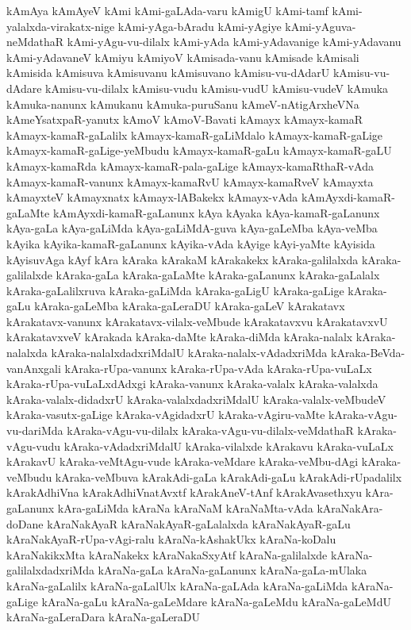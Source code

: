 {kAmAya
kAmAyeV
kAmi
kAmi-gaLAda-varu
kAmigU
kAmi-tamf
kAmi-yalalxda-virakatx-nige
kAmi-yAga-bAradu
kAmi-yAgiye
kAmi-yAguva-neMdathaR
kAmi-yAgu-vu-dilalx
kAmi-yAda
kAmi-yAdavanige
kAmi-yAdavanu
kAmi-yAdavaneV
kAmiyu
kAmiyoV
kAmisada-vanu
kAmisade
kAmisali
kAmisida
kAmisuva
kAmisuvanu
kAmisuvano
kAmisu-vu-dAdarU
kAmisu-vu-dAdare
kAmisu-vu-dilalx
kAmisu-vudu
kAmisu-vudU
kAmisu-vudeV
kAmuka
kAmuka-nanunx
kAmukanu
kAmuka-puruSanu
kAmeV-nAtigArxheVNa
kAmeYsatxpaR-yanutx
kAmoV
kAmoV-Bavati
kAmayx
kAmayx-kamaR
kAmayx-kamaR-gaLalilx
kAmayx-kamaR-gaLiMdalo
kAmayx-kamaR-gaLige
kAmayx-kamaR-gaLige-yeMbudu
kAmayx-kamaR-gaLu
kAmayx-kamaR-gaLU
kAmayx-kamaRda
kAmayx-kamaR-pala-gaLige
kAmayx-kamaRthaR-vAda
kAmayx-kamaR-vanunx
kAmayx-kamaRvU
kAmayx-kamaRveV
kAmayxta
kAmayxteV
kAmayxnatx
kAmayx-lABakekx
kAmayx-vAda
kAmAyxdi-kamaR-gaLaMte
kAmAyxdi-kamaR-gaLanunx
kAya
kAyaka
kAya-kamaR-gaLanunx
kAya-gaLa
kAya-gaLiMda
kAya-gaLiMdA-guva
kAya-gaLeMba
kAya-veMba
kAyika
kAyika-kamaR-gaLanunx
kAyika-vAda
kAyige
kAyi-yaMte
kAyisida
kAyisuvAga
kAyf
kAra
kAraka
kArakaM
kArakakekx
kAraka-galilalxda
kAraka-galilalxde
kAraka-gaLa
kAraka-gaLaMte
kAraka-gaLanunx
kAraka-gaLalalx
kAraka-gaLalilxruva
kAraka-gaLiMda
kAraka-gaLigU
kAraka-gaLige
kAraka-gaLu
kAraka-gaLeMba
kAraka-gaLeraDU
kAraka-gaLeV
kArakatavx
kArakatavx-vanunx
kArakatavx-vilalx-veMbude
kArakatavxvu
kArakatavxvU
kArakatavxveV
kArakada
kAraka-daMte
kAraka-diMda
kAraka-nalalx
kAraka-nalalxda
kAraka-nalalxdadxriMdalU
kAraka-nalalx-vAdadxriMda
kAraka-BeVda-vanAnxgali
kAraka-rUpa-vanunx
kAraka-rUpa-vAda
kAraka-rUpa-vuLaLx
kAraka-rUpa-vuLaLxdAdxgi
kAraka-vanunx
kAraka-valalx
kAraka-valalxda
kAraka-valalx-didadxrU
kAraka-valalxdadxriMdalU
kAraka-valalx-veMbudeV
kAraka-vasutx-gaLige
kAraka-vAgidadxrU
kAraka-vAgiru-vaMte
kAraka-vAgu-vu-dariMda
kAraka-vAgu-vu-dilalx
kAraka-vAgu-vu-dilalx-veMdathaR
kAraka-vAgu-vudu
kAraka-vAdadxriMdalU
kAraka-vilalxde
kArakavu
kAraka-vuLaLx
kArakavU
kAraka-veMtAgu-vude
kAraka-veMdare
kAraka-veMbu-dAgi
kAraka-veMbudu
kAraka-veMbuva
kArakAdi-gaLa
kArakAdi-gaLu
kArakAdi-rUpadalilx
kArakAdhiVna
kArakAdhiVnatAvxtf
kArakAneV-tAnf
kArakAvasethxyu
kAra-gaLanunx
kAra-gaLiMda
kAraNa
kAraNaM
kAraNaMta-vAda
kAraNakAra-doDane
kAraNakAyaR
kAraNakAyaR-gaLalalxda
kAraNakAyaR-gaLu
kAraNakAyaR-rUpa-vAgi-ralu
kAraNa-kAshakUkx
kAraNa-koDalu
kAraNakikxMta
kAraNakekx
kAraNakaSxyAtf
kAraNa-galilalxde
kAraNa-galilalxdadxriMda
kAraNa-gaLa
kAraNa-gaLanunx
kAraNa-gaLa-mUlaka
kAraNa-gaLalilx
kAraNa-gaLalUlx
kAraNa-gaLAda
kAraNa-gaLiMda
kAraNa-gaLige
kAraNa-gaLu
kAraNa-gaLeMdare
kAraNa-gaLeMdu
kAraNa-gaLeMdU
kAraNa-gaLeraDara
kAraNa-gaLeraDU
}
